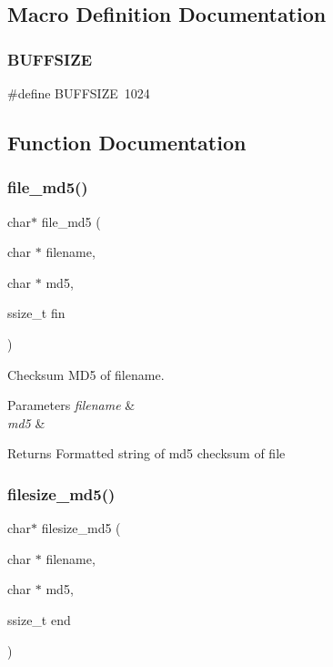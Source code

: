 \subsection{Macro Definition Documentation}
\mbox{\label{prueba_8c_a39912bfe2a55f30e269196f9141d845d}} 
\subsubsection{B\+U\+F\+F\+S\+I\+ZE}
{\footnotesize\ttfamily \#define B\+U\+F\+F\+S\+I\+ZE~1024}



\subsection{Function Documentation}
\mbox{\label{prueba_8c_a7a5c6d36c7e9c1b39aa1bdf8064b2844}} 
\subsubsection{file\+\_\+md5()}
{\footnotesize\ttfamily char$\ast$ file\+\_\+md5 (\begin{DoxyParamCaption}\item[{char $\ast$}]{filename,  }\item[{char $\ast$}]{md5,  }\item[{ssize\+\_\+t}]{fin }\end{DoxyParamCaption})}



Checksum M\+D5 of filename. 


\begin{DoxyParams}{Parameters}
{\em filename} & \\
\hline
{\em md5} & \\
\hline
\end{DoxyParams}
\begin{DoxyReturn}{Returns}
Formatted string of md5 checksum of file 
\end{DoxyReturn}
\mbox{\label{prueba_8c_aaae630ba58a68538d567fcb403837d32}} 
\subsubsection{filesize\+\_\+md5()}
{\footnotesize\ttfamily char$\ast$ filesize\+\_\+md5 (\begin{DoxyParamCaption}\item[{char $\ast$}]{filename,  }\item[{char $\ast$}]{md5,  }\item[{ssize\+\_\+t}]{end }\end{DoxyParamCaption})}

